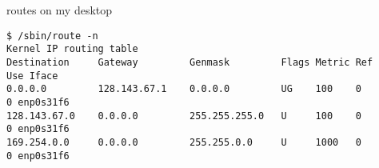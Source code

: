 \begin{frame}[fragile]{routes on my desktop}
\begin{Verbatim}[fontsize=\fontsize{9}{10}\selectfont]
$ /sbin/route -n
Kernel IP routing table
Destination     Gateway         Genmask         Flags Metric Ref    Use Iface
0.0.0.0         128.143.67.1    0.0.0.0         UG    100    0        0 enp0s31f6
128.143.67.0    0.0.0.0         255.255.255.0   U     100    0        0 enp0s31f6
169.254.0.0     0.0.0.0         255.255.0.0     U     1000   0        0 enp0s31f6
\end{Verbatim}
\end{frame}
